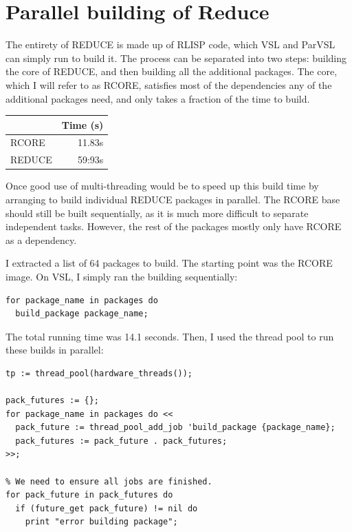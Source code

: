 \section{Parallel building of Reduce}

The entirety of REDUCE is made up of RLISP code, which VSL and ParVSL
can simply run to build it. The process can be separated into two steps:
building the core of REDUCE, and then building all the additional packages.
The core, which I will refer to as RCORE, satisfies most of the dependencies
any of the additional packages need, and only takes a fraction of the time
to build.

\begin{table}[H]
\centering
\begin{tabular}{lr}
 & Time (s)\\
\hline
RCORE & 11.83s\\
REDUCE & 59:93s\\
\end{tabular}
\end{table}

Once good use of multi-threading would be to speed up this build time by
arranging to build individual REDUCE packages in parallel. The RCORE base
should still be built sequentially, as it is much more difficult to
separate independent tasks. However, the rest of the packages mostly
only have RCORE as a dependency.

I extracted a list of 64 packages to build. The starting point was the
RCORE image. On VSL, I simply ran the building sequentially:

\begin{verbatim}
for package_name in packages do
  build_package package_name;
\end{verbatim}

The total running time was 14.1 seconds. Then, I used the thread pool
to run these builds in parallel:

\begin{verbatim}
tp := thread_pool(hardware_threads());

pack_futures := {};
for package_name in packages do <<
  pack_future := thread_pool_add_job 'build_package {package_name};
  pack_futures := pack_future . pack_futures;
>>;

% We need to ensure all jobs are finished.
for pack_future in pack_futures do
  if (future_get pack_future) != nil do
    print "error building package";
\end{verbatim}

